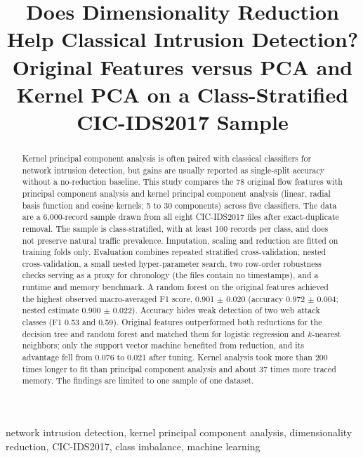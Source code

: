 \documentclass[conference,a4paper]{IEEEtran}
\begin{document}
\title{Does Dimensionality Reduction Help Classical Intrusion Detection? Original Features versus PCA and Kernel PCA on a Class-Stratified CIC-IDS2017 Sample}
\author{
\and
{}
}
\maketitle
\begin{abstract}
Kernel principal component analysis is often paired with classical classifiers for network intrusion detection, but gains are usually reported as single-split accuracy without a no-reduction baseline. This study compares the 78 original flow features with principal component analysis and kernel principal component analysis (linear, radial basis function and cosine kernels; 5 to 30 components) across five classifiers. The data are a 6,000-record sample drawn from all eight CIC-IDS2017 files after exact-duplicate removal. The sample is class-stratified, with at least 100 records per class, and does not preserve natural traffic prevalence. Imputation, scaling and reduction are fitted on training folds only. Evaluation combines repeated stratified cross-validation, nested cross-validation, a small nested hyper-parameter search, two row-order robustness checks serving as a proxy for chronology (the files contain no timestamps), and a runtime and memory benchmark. A random forest on the original features achieved the highest observed macro-averaged F1 score, 0.901 $\pm$ 0.020 (accuracy 0.972 $\pm$ 0.004; nested estimate 0.900 $\pm$ 0.022). Accuracy hides weak detection of two web attack classes (F1 0.53 and 0.59). Original features outperformed both reductions for the decision tree and random forest and matched them for logistic regression and $k$-nearest neighbors; only the support vector machine benefited from reduction, and its advantage fell from 0.076 to 0.021 after tuning. Kernel analysis took more than 200 times longer to fit than principal component analysis and about 37 times more traced memory. The findings are limited to one sample of one dataset.
\end{abstract}
\begin{IEEEkeywords}
network intrusion detection, kernel principal component analysis, dimensionality reduction, CIC-IDS2017, class imbalance, machine learning
\end{IEEEkeywords}
\end{document}
